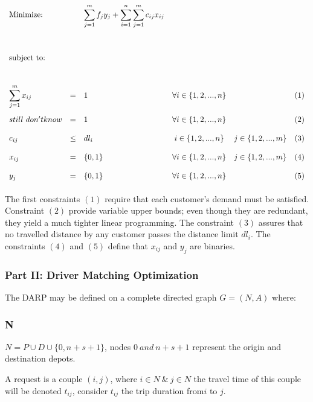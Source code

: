 \documentclass{article}
\begin{document}
\begin{equation*}
\def\arraystretch{2}
\begin{array}{lllcll} %
\text{Minimize:}  && \displaystyle\sum\limits_{j=1}^{m}f_{j} y_{j} + \sum\limits_{i=1}^{n}\sum\limits_{j=1}^{m}c_{ij}x_{ij} && & \\
	&	&	&	&	&  \\
\text{subject to:}&   &  &  & &\\
	&	&	& 	&	& \\
	 \displaystyle\sum\limits_{j=1}^{m}x_{ij} &=& 1 &  \forall i \in \{1,2,...,n\} & & (1) \\  
	  still \ don't know &=& 1 &  \forall  i \in \{1,2,...,n\}  & & (2) \\ 
	 c_{ij} &\leq& dl_i &  i \in \{1,2,...,n\} &j \in \{1,2,...,m\}  & (3) \\ 
	 x_{ij} &=& \{0,1\} &  \forall  i \in \{1,2,...,n\} &j \in \{1,2,...,m\} & (4) \\ 
	 y_{j} &=& \{0,1\} &  \forall i \in \{1,2,...,n\} & & (5) \\ 
\end{array}
\end{equation*}

The first constraints $(1)$ require that each customer’s demand must be satisfied. Constraint $(2)$ provide variable upper bounds; even though they are redundant, they yield a much tighter linear programming. The constraint $(3)$ assures that no travelled distance by any customer passes the distance limit $dl_i$. The constraints $(4)$ and $(5)$ define that $x_{ij}$ and $y_j$ are binaries.

\subsubsection{Part II: Driver Matching Optimization}
\label{subsec:darp}

The DARP may be defined on a complete directed graph $G = (N,A)$ where:


\subsubsection*{N}

$N = P \cup D \cup \{0, n + s + 1\}$, nodes $0 \ and \  n + s + 1$ represent the origin and destination depots.

A request is a couple $(i,j)$, where $i \in N\  \& \  j \in N $ the travel time of this couple will be denoted $t_{ij}$,  consider $t_{ij}$ the trip duration from$i$ to $j$.
\end{document}
